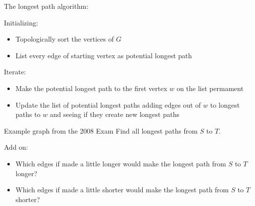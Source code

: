 \documentclass{beamer}
\begin{document}
\begin{frame}{The longest path algorithm:}
\begin{block}{Initializing:}
  \begin{itemize}
    \item Topologically sort the vertices of $G$ 
    \item List every edge of starting vertex as potential longest path
  \end{itemize}
\end{block}

\begin{block}{Iterate:}
  \begin{itemize}
  \item Make the potential longest path to the first vertex $w$  on the list permament
  \item Update the list of potential longest paths adding edges out of $w$ to longest paths to $w$ and seeing if they create new longest paths
  \end{itemize}
  \end{block}
  
  

  
  \end{frame}


\begin{frame}{Example graph from the 2008 Exam}
Find all longest paths from $S$ to $T$.
\begin{center}
\end{center}

\begin{block}{Add on:}
\begin{itemize}
\item  Which edges if made a little longer would make the longest path from $S$ to $T$ longer?
\item  Which edges if made a little shorter would make the longest path from $S$ to $T$ shorter?
\end{itemize}
\end{block}

  \end{frame}
  
\end{document}
